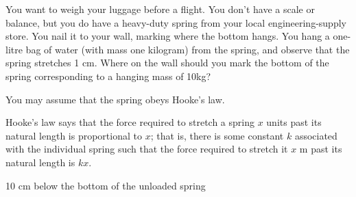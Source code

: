 \begin{question}
You want to weigh your luggage  before a flight. You don't have a scale or balance, but you do have a heavy-duty spring from your local engineering-supply store. You nail it to your wall, marking where the bottom hangs. You hang a one-litre bag of water (with mass one kilogram)  from the spring, and observe that the spring stretches 1 cm. Where on the wall should you mark the bottom of the spring corresponding to a hanging mass of 10kg?

\begin{center}
\end{center}

You may assume that the spring obeys Hooke's law.
\end{question}
\begin{hint}
Hooke's law says that the force required to stretch a spring $x$ units past its natural length is proportional to $x$; that is, there is some constant $k$ associated with the individual spring such that the force required to stretch it $x$ m past its natural length is $kx$.
\end{hint}
\begin{answer}
10 cm below the bottom of the unloaded spring
\end{answer}
